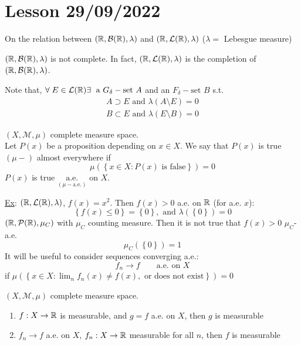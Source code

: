 \section{Lesson 29/09/2022}
\begin{remark}
    On the relation between \((\mathbb{R}, \mathcal{B}(\mathbb{R}), \lambda)\) and  \((\mathbb{R}, \mathcal{L}(\mathbb{R}), \lambda)\) \qquad (\(\lambda =\) Lebesgue measure)

    \((\mathbb{R}, \mathcal{B}(\mathbb{R}), \lambda)\) is not complete. In fact, \((\mathbb{R}, \mathcal{L}(\mathbb{R}), \lambda)\) is the completion of \((\mathbb{R}, \mathcal{B}(\mathbb{R}), \lambda)\).

    Note that, \(\forall \; E \in \mathcal{L}(\mathbb{R}) \exists \; \mbox{ a } G_{\delta}-\mbox{set } A\) and an \(F_{\delta}-\mbox{set } B\) s.t.
    \[
        \begin{array}{l}
            A \supset E \mbox{ and } \lambda(A \setminus E) = 0 \\
            B \subset E \mbox{ and } \lambda(E \setminus B) = 0
        \end{array}
    \]
\end{remark}
\((X, \mathcal{M}, \mu)\) complete measure space. \\
Let \(P(x)\) be a proposition depending on \(x \in X\). We say that \(P(x)\) is true \((\mu-)\) almost everywhere if 
\[
    \mu\left(\left\{ x \in X : P(x) \mbox{ is false}\right\}\right) = 0
\]
\(P(x)\) is true \(\underset{(\mu-\text{a.e.})}{\mbox{a.e.}}\) on \(X\).

\underline{Ex}: \((\mathbb{R}, \mathcal{L}(\mathbb{R}), \lambda)\), \(f(x) = x^2\).  
Then \(f(x) > 0\) a.e. on \(\mathbb{R}\) (for a.e. \(x\)):
\[
    \left\{ f(x) \leq 0 \right\} = \left\{ 0 \right\}, \mbox{ and } \lambda(\left\{ 0 \right\}) = 0
\]
\((\mathbb{R}, \mathcal{P}(\mathbb{R}), \mu_C)\) with \(\mu_C\) counting measure. Then it is not true that \(f(x) > 0\) \(\mu_C\)-a.e. 
\[
    \mu_C \left(\left\{ 0 \right\}\right) = 1
\]
It will be useful to consider sequences converging a.e.: 
\[
    f_n \to f \qquad \mbox{a.e. on }X
\]
if \(\mu\left( \left\{ x \in X : \lim_n f_n(x) \neq f(x), \mbox{ or does not exist} \right\}\right) = 0\)

\begin{proposition}
    \((X, \mathcal{M}, \mu)\) complete measure space. 
    \begin{enumerate}
        \item \(f: X \to \mathbb{R}\) is measurable, and \(g = f \) a.e. on \(X\), then \(g\) is measurable
        \item \(f_n \to f\) a.e. on \(X\), \(f_n : X \to \mathbb{R}\) measurable for all \(n\), then \(f\) is measurable
    \end{enumerate}
\end{proposition}

